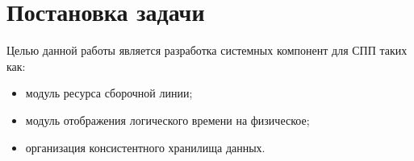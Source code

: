 \section{Постановка задачи}
Целью данной работы является разработка системных компонент для СПП таких как:
\begin{itemize}
	\item модуль ресурса сборочной линии;
	\item модуль отображения логического времени на физическое;
	\item организация консистентного хранилища данных.
\end{itemize}